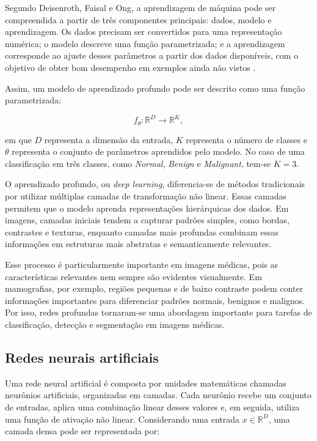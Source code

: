 \documentclass[
    12pt,
    openright,
    oneside,
    a4paper,
    english,
    brazil
]{abntex2}
\begin{document}
Segundo Deisenroth, Faisal e Ong, a aprendizagem de máquina pode ser compreendida a partir de três componentes principais: dados, modelo e aprendizagem. Os dados precisam ser convertidos para uma representação numérica; o modelo descreve uma função parametrizada; e a aprendizagem corresponde ao ajuste desses parâmetros a partir dos dados disponíveis, com o objetivo de obter bom desempenho em exemplos ainda não vistos \cite{deisenroth2020mathematics}.

Assim, um modelo de aprendizado profundo pode ser descrito como uma função parametrizada:

\[
f_{\theta}: \mathbb{R}^{D} \rightarrow \mathbb{R}^{K},
\]

em que \(D\) representa a dimensão da entrada, \(K\) representa o número de classes e \(\theta\) representa o conjunto de parâmetros aprendidos pelo modelo. No caso de uma classificação em três classes, como \textit{Normal}, \textit{Benign} e \textit{Malignant}, tem-se \(K=3\).

O aprendizado profundo, ou \textit{deep learning}, diferencia-se de métodos tradicionais por utilizar múltiplas camadas de transformação não linear. Essas camadas permitem que o modelo aprenda representações hierárquicas dos dados. Em imagens, camadas iniciais tendem a capturar padrões simples, como bordas, contrastes e texturas, enquanto camadas mais profundas combinam essas informações em estruturas mais abstratas e semanticamente relevantes.

Esse processo é particularmente importante em imagens médicas, pois as características relevantes nem sempre são evidentes visualmente. Em mamografias, por exemplo, regiões pequenas e de baixo contraste podem conter informações importantes para diferenciar padrões normais, benignos e malignos. Por isso, redes profundas tornaram-se uma abordagem importante para tarefas de classificação, detecção e segmentação em imagens médicas.

\subsection{Redes neurais artificiais}

Uma rede neural artificial é composta por unidades matemáticas chamadas neurônios artificiais, organizadas em camadas. Cada neurônio recebe um conjunto de entradas, aplica uma combinação linear desses valores e, em seguida, utiliza uma função de ativação não linear. Considerando uma entrada \(x \in \mathbb{R}^{D}\), uma camada densa pode ser representada por:
\end{document}
